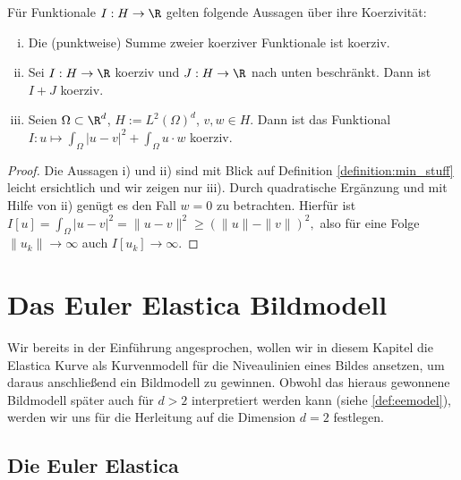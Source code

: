\documentclass{mythesis}
\begin{document}
\begin{lemma} \label{lem:coercivity}
    Für Funktionale $I: H \to \R$ gelten folgende Aussagen über ihre Koerzivität:
    \begin{enumerate}[i)]
        \item
	   Die (punktweise) Summe zweier koerziver Funktionale ist koerziv.
       \item
	   Sei $I: H \to \R$ koerziv und $J: H \to \R$ nach unten beschränkt.
	   Dann ist $I + J$ koerziv.
       \item
	   Seien $\Omega \subset \R^d$, $H := L^2(\Omega)^d$, $v, w \in H$.
	   Dann ist das Funktional
	   \begin{math}
	       I: u \mapsto \int_\Omega |u - v|^2 + \int_\Omega u \cdot w
	   \end{math}
	   koerziv.
    \end{enumerate}
    \begin{proof}
	Die Aussagen i) und ii) sind mit Blick auf Definition \ref{definition:min_stuff} leicht ersichtlich und wir zeigen nur iii).
	Durch quadratische Ergänzung und mit Hilfe von ii) genügt es den Fall $w = 0$ zu betrachten.
	Hierfür ist
	\begin{math}
	    I[u] = \int_\Omega |u - v|^2 = \|u - v\|^2 \ge (\|u\| - \|v\|)^2,
	\end{math}
	also für eine Folge $\|u_k\| \to \infty$ auch $I[u_k] \to \infty$.
    \end{proof}
\end{lemma}







\chapter{Das Euler Elastica Bildmodell} \label{chap:image_model}


Wir bereits in der Einführung angesprochen, wollen wir in diesem Kapitel die Elastica Kurve als Kurvenmodell für die Niveaulinien eines Bildes ansetzen, um daraus anschließend ein Bildmodell zu gewinnen.
Obwohl das hieraus gewonnene Bildmodell später auch für $d > 2$ interpretiert werden kann (siehe \ref{def:eemodel}), werden wir uns für die Herleitung auf die Dimension $d = 2$ festlegen.

\section{Die Euler Elastica}
\end{document}
